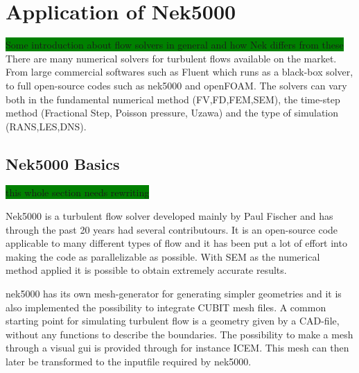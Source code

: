 
\chapter{Application of Nek5000} %

\label{nek} %


\colorbox{green}{Some introduction about flow solvers in general and how Nek differs from these}
There are many numerical solvers for turbulent flows available on the market.
From large commercial softwares such as Fluent which runs as a 
black-box solver, to full open-source codes such as nek5000 and openFOAM. 
The solvers can vary both in the fundamental numerical method (FV,FD,FEM,SEM), 
the time-step method (Fractional Step, Poisson pressure, Uzawa) 
and the type of simulation (RANS,LES,DNS).


\section{Nek5000 Basics}
\colorbox{green}{this whole section needs rewriting}

Nek5000 is a turbulent flow solver developed mainly by Paul Fischer
and has through the past 20 years had several contributours. 
It is an open-source code applicable to many different types of flow 
and it has been put a lot of effort into making the code as parallelizable as possible.
With SEM as the numerical method applied it is possible to obtain extremely accurate results.  

nek5000 has its own mesh-generator for generating simpler geometries and it is also implemented the possibility to integrate CUBIT mesh 
files. A common starting point for simulating turbulent flow is a geometry given by a CAD-file,
without any functions to describe the boundaries.
The possibility to make a mesh through a visual gui is provided through for instance ICEM.
This mesh can then later be transformed to the inputfile required by nek5000. 

